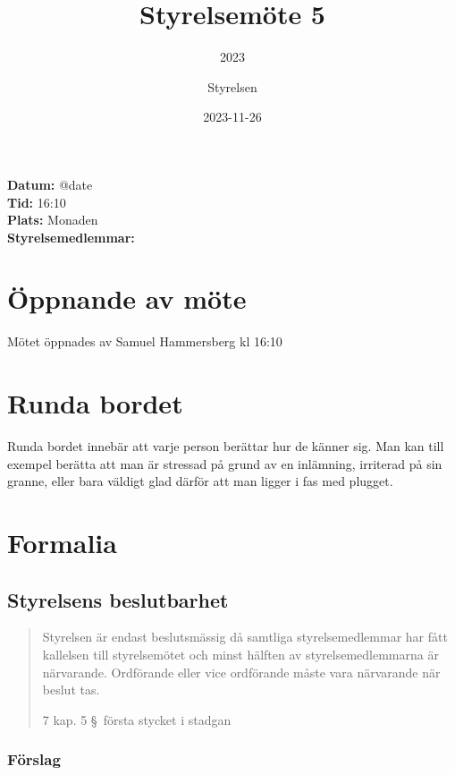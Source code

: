 \documentclass[protokoll]{dvd}
\begin{document}
\title{Styrelsemöte 5}
\subtitle{2023}
\author{Styrelsen}
\date{2023-11-26}


\textbf{Datum:} \csname @date\endcsname\\
\textbf{Tid:} 16:10\\
\textbf{Plats:} Monaden\\
\textbf{Styrelsemedlemmar:}
\begin{närvarande_förtroendevalda}
\end{närvarande_förtroendevalda}

\section{Öppnande av möte}

Mötet öppnades av Samuel Hammersberg kl 16:10

\section{Runda bordet}

Runda bordet innebär att varje person berättar hur de känner sig.
Man kan till exempel berätta att man är stressad på grund av en inlämning, irriterad på sin granne, eller bara väldigt glad därför att man ligger i fas med plugget.

\section{Formalia}

\subsection{Styrelsens beslutbarhet}

\blockquote[7 kap. 5 \S~första stycket i stadgan][]{%
    Styrelsen är endast beslutsmässig då samtliga styrelsemedlemmar har fått kallelsen till styrelsemötet och minst hälften av styrelsemedlemmarna är närvarande.
    Ordförande eller vice ordförande måste vara närvarande när beslut tas.
}

\subsubsection*{Förslag}
\end{document}
